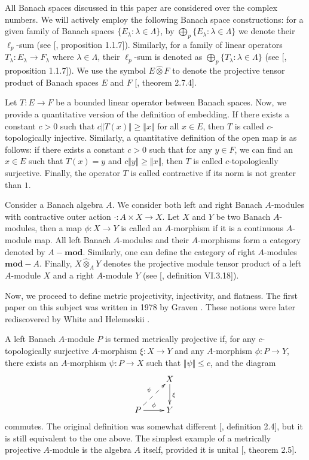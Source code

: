 \documentclass[12pt]{article}
\newcommand{\projtens}{\mathbin{\widehat{\otimes}}}
\newcommand{\projmodtens}[1]{\mathbin{\widehat{\otimes}}_{#1}}
\begin{document}
All Banach spaces discussed in this paper are considered over the complex 
numbers. We will actively employ the following Banach space constructions: for 
a given family of Banach spaces $\{E_\lambda: \lambda\in\Lambda\}$, 
by $\bigoplus_p\{E_\lambda: \lambda\in\Lambda\}$ we denote their $\ell_p$-sum 
(see [\cite{HelLectAndExOnFuncAn}, proposition 1.1.7]). 
Similarly, for a family of linear operators $T_\lambda:E_\lambda\to F_\lambda$ 
where $\lambda\in\Lambda$, their $\ell_p$-sum is denoted 
as $\bigoplus_p\{T_\lambda:\lambda\in\Lambda\}$ 
(see [\cite{HelLectAndExOnFuncAn}, proposition 1.1.7]). We use the 
symbol $E\projtens F$ to denote the projective tensor product of Banach 
spaces $E$ and $F$ [\cite{HelLectAndExOnFuncAn}, theorem 2.7.4].

Let $T:E\to F$ be a bounded linear operator between Banach spaces. Now, we 
provide a quantitative version of the definition of embedding. If there exists 
a constant $c>0$ such that $c\Vert T(x)\Vert\geq \Vert x\Vert$ for all $x\in E$, 
then $T$ is called $c$-topologically injective. Similarly, a quantitative 
definition of the open map is as follows: if there exists a constant $c>0$ such 
that for any $y\in F$, we can find an $x\in E$ such that $T(x)=y$ 
and $c\Vert y\Vert\geq \Vert x\Vert$, then $T$ is called $c$-topologically 
surjective. Finally, the operator $T$ is called contractive if its norm 
is not greater than $1$.

Consider a Banach algebra $A$. We consider both left and right 
Banach $A$-modules with contractive outer action $\cdot:A\times X\to X$. 
Let $X$ and $Y$ be two Banach $A$-modules, then a map $\phi:X\to Y$ is 
called an $A$-morphism if it is a continuous $A$-module map. All left 
Banach $A$-modules and their $A$-morphisms form a category denoted 
by $A-\mathbf{mod}$. Similarly, one can define the category of right 
$A$-modules $\mathbf{mod}-A$. Finally, $X\projmodtens{A} Y$ denotes the projective 
module tensor product of a left $A$-module $X$ and a right $A$-module $Y$ 
(see [\cite{HelBanLocConvAlg}, definition VI.3.18]).

Now, we proceed to define metric projectivity, injectivity, and flatness. 
The first paper on this subject was written in 1978 by 
Graven \cite{GravInjProjBanMod}. These notions were later rediscovered by 
White \cite{WhiteInjmoduAlg} and 
Helemeskii \cite{HelMetrFrQMod,HelMetrFlatNorMod}.

A left Banach $A$-module $P$ is termed metrically projective if, for 
any $c$-topologically surjective $A$-morphism $\xi:X\to Y$ and any $A$-morphism 
$\phi:P\to Y$, there exists an $A$-morphism $\psi:P\to X$ such 
that $\Vert\psi\Vert\leq c$, and the diagram
$$
    \xymatrix{
    & {X} \ar[d]^{\xi}\\
    {P} \ar@{-->}[ur]^{\psi} \ar[r]^{\phi} &{Y}}
$$
commutes. The original definition was somewhat 
different [\cite{GravInjProjBanMod}, definition 2.4], but it is still 
equivalent to the one above. The simplest example of a metrically 
projective $A$-module is the algebra $A$ itself, provided it is 
unital [\cite{GravInjProjBanMod}, theorem 2.5].
\end{document}
